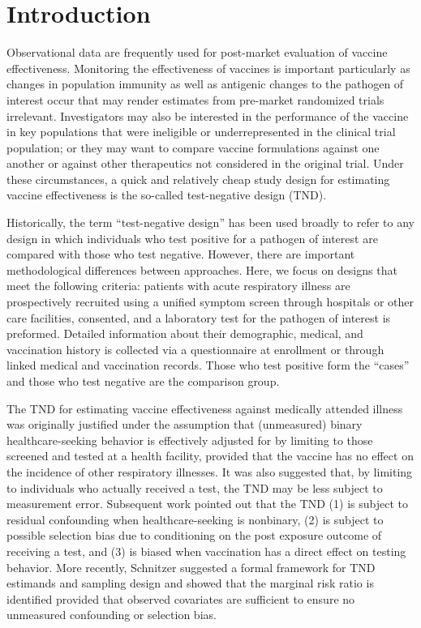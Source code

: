 \documentclass[11pt]{article}
\begin{document}
\section{Introduction} \label{sec:introduction}
Observational data are frequently used for post-market evaluation of vaccine effectiveness. Monitoring the effectiveness of vaccines is important particularly as changes in population immunity as well as antigenic changes to the pathogen of interest occur that may render estimates from pre-market randomized trials irrelevant. Investigators may also be interested in the performance of the vaccine in key populations that were ineligible or underrepresented in the clinical trial population; or they may want to compare vaccine formulations against one another or against other therapeutics not considered in the original trial. Under these circumstances, a quick and relatively cheap study design for estimating vaccine effectiveness is the so-called test-negative design (TND). 
 
Historically, the term ``test-negative design'' has been used broadly to refer to any design in which individuals who test positive for a pathogen of interest are compared with those who test negative. However, there are important methodological differences between approaches. Here, we focus on designs that meet the following criteria: patients with acute respiratory illness are prospectively recruited using a unified symptom screen through hospitals or other care facilities, consented, and a laboratory test for the pathogen of interest is preformed. Detailed information about their demographic, medical, and vaccination history is collected via a questionnaire at enrollment or through linked medical and vaccination records. Those who test positive form the ``cases'' and those who test negative are the comparison group. 

The TND for estimating vaccine effectiveness against medically attended illness was originally justified under the assumption that (unmeasured) binary healthcare-seeking behavior is effectively adjusted for by limiting to those screened and tested at a health facility, provided that the vaccine has no effect on the incidence of other respiratory illnesses. It was also suggested that, by limiting to individuals who actually received a test, the TND may be less subject to measurement error. Subsequent work pointed out that the TND (1) is subject to residual confounding when healthcare-seeking is nonbinary, (2) is subject to possible selection bias due to conditioning on the post exposure outcome of receiving a test, and (3) is biased when vaccination has a direct effect on testing behavior. More recently, Schnitzer suggested a formal framework for TND estimands and sampling design and showed that the marginal risk ratio is identified provided that observed covariates are sufficient to ensure no unmeasured confounding or selection bias. 
\end{document}
